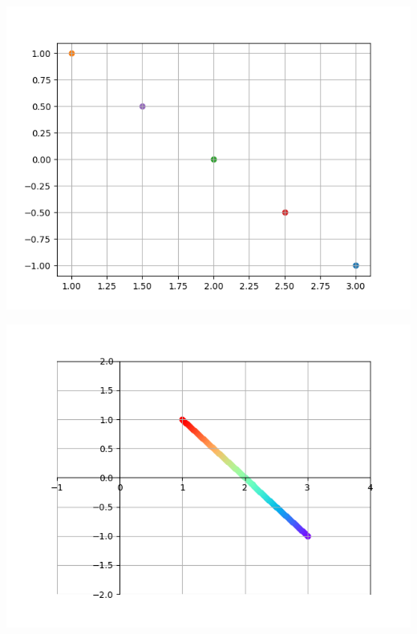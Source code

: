 \begin{multicols}{2}
	\columnbreak
	\centering
	\includegraphics[scale=.7]{segment.png}
\end{multicols}

\begin{multicols}{2}
	\columnbreak
	\centering
	\includegraphics[scale=.6]{segment-ameliore.png}
\end{multicols}


